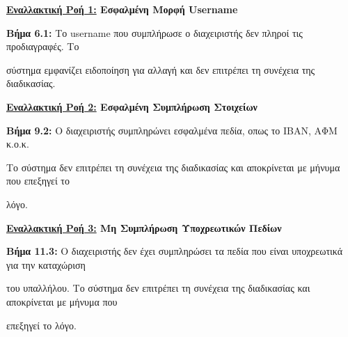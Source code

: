 \documentclass{article}
\begin{document}
  \textbf{\underline{Εναλλακτική Ροή 1:} Εσφαλμένη Μορφή Username} \vspace{0.2cm}
\par \textbf{Βήμα 6.1:} Το username που συμπλήρωσε ο διαχειριστής δεν πληροί τις προδιαγραφές. Tο \par σύστημα εμφανίζει ειδοποίηση για αλλαγή και δεν επιτρέπει τη συνέχεια της διαδικασίας.\vspace{0.1cm}

\vspace{0.2cm}

\textbf{\underline{Εναλλακτική Ροή 2:} Εσφαλμένη Συμπλήρωση Στοιχείων} \vspace{0.2cm}
\par \textbf{Βήμα 9.2:} Ο διαχειριστής συμπληρώνει εσφαλμένα πεδία, οπως το ΙΒΑΝ, ΑΦΜ κ.ο.κ. \par Το σύστημα δεν επιτρέπει τη συνέχεια της διαδικασίας και αποκρίνεται με μήνυμα που επεξηγεί το \par λόγο.  \vspace{0.2cm}

\textbf{\underline{Εναλλακτική Ροή 3:} Μη Συμπλήρωση Υποχρεωτικών Πεδίων} \vspace{0.2cm}
\par \textbf{Βήμα 11.3:} Ο διαχειριστής δεν έχει συμπληρώσει τα πεδία που είναι υποχρεωτικά για την καταχώριση \par του υπαλλήλου. Το σύστημα δεν επιτρέπει τη συνέχεια της διαδικασίας και αποκρίνεται με μήνυμα που \par επεξηγεί το λόγο. 

 
\end{document}
